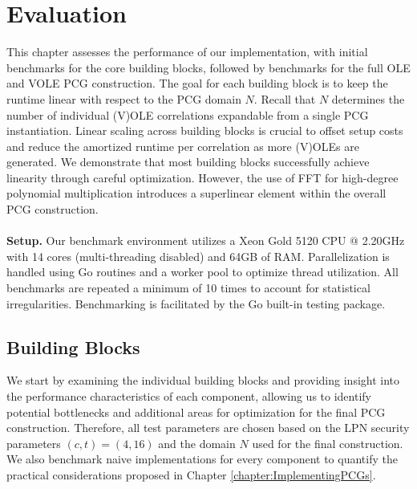 \chapter{Evaluation}
\label{chapter:evaluation}
This chapter assesses the performance of our implementation, with initial benchmarks for the core building blocks, followed by benchmarks for the full OLE and VOLE PCG construction. The goal for each building block is to keep the runtime linear with respect to the PCG domain $N$. Recall that $N$ determines the number of individual (V)OLE correlations expandable from a single PCG instantiation. Linear scaling across building blocks is crucial to offset setup costs and reduce the amortized runtime per correlation as more (V)OLEs are generated. We demonstrate that most building blocks successfully achieve linearity through careful optimization. However, the use of FFT for high-degree polynomial multiplication introduces a superlinear element within the overall PCG construction.
\\\\
\textbf{Setup.} Our benchmark environment utilizes a Xeon Gold 5120 CPU @ 2.20GHz with 14 cores (multi-threading disabled) and 64GB of RAM. Parallelization is handled using Go routines and a worker pool to optimize thread utilization. All benchmarks are repeated a minimum of 10 times to account for statistical irregularities. Benchmarking is facilitated by the Go built-in testing package. 

\section{Building Blocks}
We start by examining the individual building blocks and providing insight into the performance characteristics of each component, allowing us to identify potential bottlenecks and additional areas for optimization for the final PCG construction. Therefore, all test parameters are chosen based on the LPN security parameters $(c,t)=(4,16)$ and the domain $N$ used for the final construction. We also benchmark naive implementations for every component to quantify the practical considerations proposed in Chapter \ref{chapter:ImplementingPCGs}.


